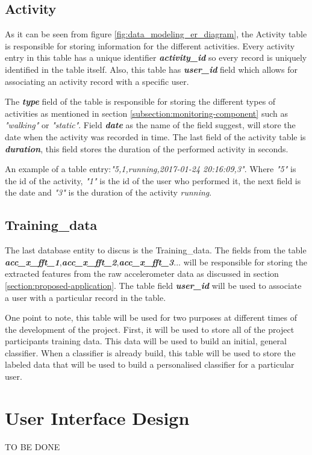         \subsection{Activity}
        As it can be seen from figure \ref{fig:data_modeling_er_diagram}, the Activity table is responsible for storing information for the different activities. Every activity entry in this table has a unique identifier \textbf{\textit{activity\_id}} so every record is uniquely identified in the table itself. Also, this table has \textbf{\textit{user\_id}} field which allows for associating an activity record with a specific user.
        
        The \textbf{\textit{type}} field of the table is responsible for storing the different types of activities as mentioned in section \ref{subsection:monitoring-component} such as \textit{"walking"} or \textit{"static"}. Field \textbf{\textit{date}} as the name of the field suggest, will store the date when the activity was recorded in time. The last field of the activity table is \textbf{\textit{duration}}, this field stores the duration of the performed activity in seconds.
        
        An example of a table entry:\textit{"5,1,running,2017-01-24 20:16:09,3"}. Where \textit{"5"} is the id of the activity, \textit{"1"} is the id of the user who performed it, the next field is the date and \textit{"3"} is the duration of the activity \textit{running}.
        
        \subsection{Training\_data}
        The last database entity to discus is the Training\_data. The fields from the table \textbf{\textit{acc\_x\_fft\_1}},\newline\textbf{\textit{acc\_x\_fft\_2}},\textbf{\textit{acc\_x\_fft\_3}}... will be responsible for storing the extracted features from the raw accelerometer data as discussed in section \ref{section:proposed-application}. The table field \textbf{\textit{user\_id}} will be used to associate a user with a particular record in the table.
        
        One point to note, this table will be used for two purposes at different times of the development of the project. First, it will be used to store all of the project participants training data. This data will be used to build an initial, general classifier. When a classifier is already build, this table will be used to store the labeled data that will be used to build a personalised classifier for a particular user.
    
    
        
    \section{User Interface Design}
    TO BE DONE